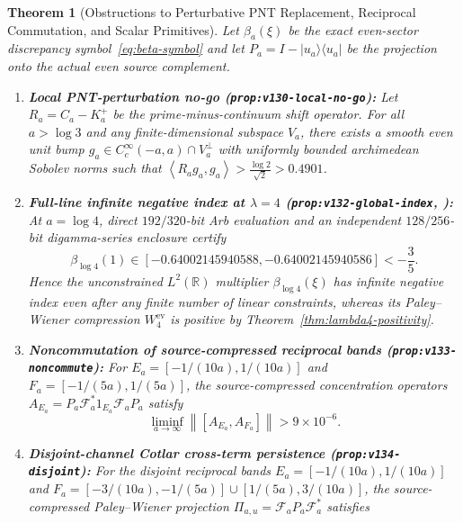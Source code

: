 \documentclass[11pt]{article}
\newtheorem{theorem}{Theorem}[section]
\theoremstyle{remark}
\newcommand{\norm}[1]{\left\lVert #1\right\rVert}
\newcommand{\ip}[2]{\left\langle #1,#2\right\rangle}
\begin{document}
\begin{theorem}[Obstructions to Perturbative PNT Replacement, Reciprocal Commutation, and Scalar Primitives]
\label{thm:concentration-obstructions}
Let $\beta_a(\xi)$ be the exact even-sector discrepancy symbol~\eqref{eq:beta-symbol} and let $P_a = I - |u_a\rangle\langle u_a|$ be the projection onto the actual even source complement.
\begin{enumerate}[label=(\alph*)]
  \item \textbf{Local PNT-perturbation no-go (\texttt{prop:v130-local-no-go}):} Let $R_a = C_a - K_a^+$ be the prime-minus-continuum shift operator. For all $a > \log 3$ and any finite-dimensional subspace $V_a$, there exists a smooth even unit bump $g_a \in C_c^\infty(-a,a) \cap V_a^\perp$ with uniformly bounded archimedean Sobolev norms such that $\ip{R_a g_a}{g_a} > \frac{\log 2}{\sqrt{2}} > 0.4901$.
  \item \textbf{Full-line infinite negative index at $\lambda = 4$ (\texttt{prop:v132-global-index}, ):} At $a = \log 4$, direct $192/320$-bit Arb evaluation and an independent $128/256$-bit digamma-series enclosure certify
  \begin{equation}
    \beta_{\log 4}(1) \in [-0.64002145940588, -0.64002145940586] < -\frac{3}{5}.
  \end{equation}
  Hence the unconstrained $L^2(\mathbb{R})$ multiplier $\beta_{\log 4}(\xi)$ has infinite negative index even after any finite number of linear constraints, whereas its Paley--Wiener compression $W_4^{\mathrm{ev}}$ is positive by Theorem~\ref{thm:lambda4-positivity}.
  \item \textbf{Noncommutation of source-compressed reciprocal bands (\texttt{prop:v133-noncommute}):} For $E_a = [-1/(10a), 1/(10a)]$ and $F_a = [-1/(5a), 1/(5a)]$, the source-compressed concentration operators $A_{E_a} = P_a \mathcal{F}_a^* 1_{E_a}\mathcal{F}_a P_a$ satisfy
  \begin{equation}\label{eq:commutator-lower}
    \liminf_{a \to \infty} \norm{[A_{E_a}, A_{F_a}]} > 9 \times 10^{-6}.
  \end{equation}
  \item \textbf{Disjoint-channel Cotlar cross-term persistence (\texttt{prop:v134-disjoint}):} For the disjoint reciprocal bands $E_a = [-1/(10a), 1/(10a)]$ and $F_a = [-3/(10a), -1/(5a)] \cup [1/(5a), 3/(10a)]$, the source-compressed Paley--Wiener projection $\Pi_{a,u} = \mathcal{F}_a P_a \mathcal{F}_a^*$ satisfies
  \begin{equation}\label{eq:cotlar-lower}

\end{equation}
\end{enumerate}
\end{theorem}
\end{document}
